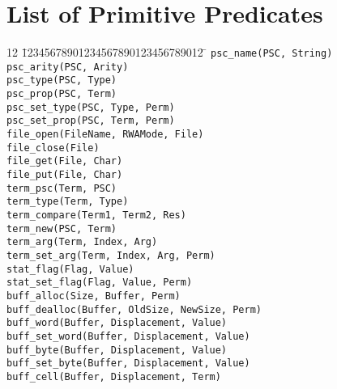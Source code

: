 \chapter{List of Primitive Predicates} \label{primitive_predicates}

\begin{tabbing}
12 \= 12345678901234567890123456789012 \=	\kill
 \> {\tt psc\_name(PSC, String)}		\>		\\
 \> {\tt psc\_arity(PSC, Arity)}		\>		\\
 \> {\tt psc\_type(PSC, Type)}			\>		\\
 \> {\tt psc\_prop(PSC, Term)}			\>		\\
 \> {\tt psc\_set\_type(PSC, Type, Perm)}	\>		\\
 \> {\tt psc\_set\_prop(PSC, Term, Perm)}	\>		\\
 \> {\tt file\_open(FileName, RWAMode, File)}	\>		\\
 \> {\tt file\_close(File)}			\>		\\
 \> {\tt file\_get(File, Char)}			\>		\\
 \> {\tt file\_put(File, Char)}			\>		\\
 \> {\tt term\_psc(Term, PSC)}			\>		\\
 \> {\tt term\_type(Term, Type)}		\>		\\
 \> {\tt term\_compare(Term1, Term2, Res)}	\>		\\
 \> {\tt term\_new(PSC, Term)}			\>		\\
 \> {\tt term\_arg(Term, Index, Arg)}		\>		\\
 \> {\tt term\_set\_arg(Term, Index, Arg, Perm)}\>		\\
 \> {\tt stat\_flag(Flag, Value)}		\>		\\
 \> {\tt stat\_set\_flag(Flag, Value, Perm)}	\>		\\
 \> {\tt buff\_alloc(Size, Buffer, Perm)}	\>		\\
 \> {\tt buff\_dealloc(Buffer, OldSize, NewSize, Perm)}	\>	\\
 \> {\tt buff\_word(Buffer, Displacement, Value)}	\>	\\
 \> {\tt buff\_set\_word(Buffer, Displacement, Value)}	\>	\\
 \> {\tt buff\_byte(Buffer, Displacement, Value)}	\>	\\
 \> {\tt buff\_set\_byte(Buffer, Displacement, Value)}	\>	\\
 \> {\tt buff\_cell(Buffer, Displacement, Term)}	\>	\\

\end{tabbing}
